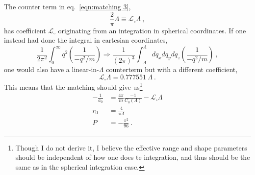 \documentclass[11pt]{article}
\begin{document}
The counter term in eq.~\eqref{eqn:matching 3},
\begin{displaymath}
\frac{2}{\pi}\Lambda \equiv \mathcal{L}_\circ\Lambda\ ,
\end{displaymath}
has coefficient $\mathcal{L}_\circ$ originating from an integration in spherical coordinates.  If one instead had done the integral in cartesian coordinates,
\begin{displaymath}
\frac{1}{2\pi^2}\int_0^\infty q^2\left(\frac{1}{-q^2/m}\right)\Longrightarrow\frac{1}{(2\pi)^3}\int_{-\Lambda}^{\Lambda}dq_x dq_y dq_z\left(\frac{1}{-q^2/m}\right)\ ,
\end{displaymath}
one would also have a linear-in-$\Lambda$ counterterm but with a different coefficient,
\begin{displaymath}
\mathcal{L}_{\square}\Lambda=0.777551\ \Lambda\ .
\end{displaymath}
This means that the matching should give us\footnote{Though I do not derive it, I believe the effective range and shape parameters should be independent of how one does te integration, and thus should be the same as in the spherical integration case.}
\begin{align}
-\frac{1}{a_0}&=\frac{4\pi}{m}\frac{-1}{C_0(\Lambda)}-\mathcal{L}_\square\Lambda\label{eqn:yet another match}\\
r_0 &= \frac{4}{\pi\Lambda}\\
P &= -\frac{\pi^2}{96}\ .
\end{align}
\end{document}
